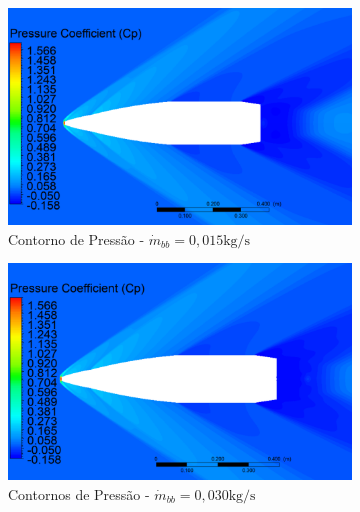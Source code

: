 \begin{figure}[!ht]
	\centering
	\begin{subfigure}[b]{0.47\textwidth}
        \centering
        \includegraphics[width=\textwidth]{contorno-pressao-2306K-vazao-0015-1pol.png}
        \caption{Contorno de Pressão - $\Dot{m}_{bb} = 0,015 \unit{\kg/\s}$}
        \label{fig:contorno-pressao-bb-1pol-vazao0015}
    \end{subfigure}
    \hfill
    \begin{subfigure}[b]{0.47\textwidth}
        \centering
        \includegraphics[width=\textwidth]{contorno-pressao-2306K-vazao-0030-1pol.png}
        \caption{Contornos de Pressão - $\Dot{m}_{bb} = 0,030 \unit{\kg/\s}$}
        \label{fig:contorno-pressao-bb-1pol-vazao0030}
    \end{subfigure}
    \hfill
    \begin{subfigure}[b]{0.47\textwidth}
        \centering

\end{subfigure}
\end{figure}
